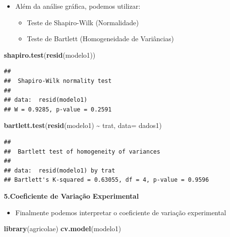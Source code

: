 \documentclass[
]{book}
\newenvironment{Shaded}{\begin{snugshade}}{\end{snugshade}}
\newcommand{\AttributeTok}[1]{\textcolor[rgb]{0.13,0.29,0.53}{#1}}
\newcommand{\FunctionTok}[1]{\textcolor[rgb]{0.13,0.29,0.53}{\textbf{#1}}}
\newcommand{\NormalTok}[1]{#1}
\newcommand{\SpecialCharTok}[1]{\textcolor[rgb]{0.81,0.36,0.00}{\textbf{#1}}}
\providecommand{\tightlist}{%
  \setlength{\itemsep}{0pt}\setlength{\parskip}{0pt}}
\begin{document}
\begin{itemize}
\tightlist
\item
  Além da análise gráfica, podemos utilizar:

  \begin{itemize}
  \tightlist
  \item
    Teste de Shapiro-Wilk (Normalidade)
  \item
    Teste de Bartlett (Homogeneidade de Variâncias)
  \end{itemize}
\end{itemize}

\begin{Shaded}
\begin{Highlighting}[]
\FunctionTok{shapiro.test}\NormalTok{(}\FunctionTok{resid}\NormalTok{(modelo1))}
\end{Highlighting}
\end{Shaded}

\begin{verbatim}
## 
##  Shapiro-Wilk normality test
## 
## data:  resid(modelo1)
## W = 0.9285, p-value = 0.2591
\end{verbatim}

\begin{Shaded}
\begin{Highlighting}[]
\FunctionTok{bartlett.test}\NormalTok{(}\FunctionTok{resid}\NormalTok{(modelo1) }\SpecialCharTok{\textasciitilde{}}\NormalTok{ trat, }\AttributeTok{data=}\NormalTok{ dados1)}
\end{Highlighting}
\end{Shaded}

\begin{verbatim}
## 
##  Bartlett test of homogeneity of variances
## 
## data:  resid(modelo1) by trat
## Bartlett's K-squared = 0.63055, df = 4, p-value = 0.9596
\end{verbatim}

\textbf{5.Coeficiente de Variação Experimental}

\begin{itemize}
\tightlist
\item
  Finalmente podemos interpretar o coeficiente de variação experimental
\end{itemize}

\begin{Shaded}
\begin{Highlighting}[]
\FunctionTok{library}\NormalTok{(agricolae)}
\FunctionTok{cv.model}\NormalTok{(modelo1)}
\end{Highlighting}
\end{Shaded}
\end{document}
